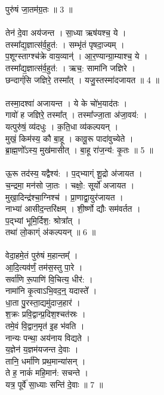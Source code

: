 पुरु॑षं जा॒तम॑ग्र॒तः ॥ 3 ॥\\
\\
तेन॑ दे॒वा अय॑जन्त । सा॒ध्या ऋष॑यश्च॒ ये ।\\
तस्मा᳚द्य॒ज्ञात्स॑र्व॒हुत॑: । सम्भृ॑तं पृषदा॒ज्यम् ।\\
प॒शूग्‍स्ताग्‍श्च॑क्रे वाय॒व्यान्॑ । आ॒र॒ण्यान्ग्रा॒म्याश्च॒ ये ।\\
तस्मा᳚द्य॒ज्ञात्स॑र्व॒हुत॑: । ऋच॒: सामा॑नि जज्ञिरे ।\\
छन्दाग्ं॑सि जज्ञिरे॒ तस्मा᳚त् । यजु॒स्तस्मा॑दजायत ॥ 4 ॥\\
\\
तस्मा॒दश्वा॑ अजायन्त । ये के चो॑भ॒याद॑तः ।\\
गावो॑ ह जज्ञिरे॒ तस्मा᳚त् । तस्मा᳚ज्जा॒ता अ॑जा॒वय॑: ।\\
यत्पुरु॑षं॒ व्य॑दधुः । क॒ति॒धा व्य॑कल्पयन् ।\\
मुखं॒ किम॑स्य॒ कौ बा॒हू । कावू॒रू पादा॑वुच्येते ।\\
ब्रा॒ह्म॒णो᳚ऽस्य॒ मुख॑मासीत् । बा॒हू रा॑ज॒न्य॑: कृ॒तः ॥ 5 ॥\\
\\
ऊ॒रू तद॑स्य॒ यद्वैश्य॑: । प॒द्भ्याग्ं शू॒द्रो अ॑जायत ।\\
च॒न्द्रमा॒ मन॑सो जा॒तः । चक्षो॒: सूर्यो॑ अजायत ।\\
मुखा॒दिन्द्र॑श्चा॒ग्निश्च॑ । प्रा॒णाद्वा॒युर॑जायत ।\\
नाभ्या॑ आसीद॒न्तरि॑क्षम् । शी॒र्ष्णो द्यौः सम॑वर्तत ।\\
प॒द्भ्यां भूमि॒र्दिश॒: श्रोत्रा᳚त् ।\\
तथा॑ लो॒काग्ं अ॑कल्पयन् ॥ 6 ॥\\
\\
वेदा॒हमे॒तं पुरु॑षं म॒हान्तम्᳚ ।\\
आ॒दि॒त्यव॑र्णं॒ तम॑स॒स्तु पा॒रे ।\\
सर्वा॑णि रू॒पाणि॑ वि॒चित्य॒ धीर॑: ।\\
नामा॑नि कृ॒त्वाऽभि॒वद॒न्॒ यदास्ते᳚ ।\\
धा॒ता पु॒रस्ता॒द्यमु॑दाज॒हार॑ ।\\
श॒क्रः प्रवि॒द्वान्प्र॒दिश॒श्चत॑स्रः ।\\
तमे॒वं वि॒द्वान॒मृत॑ इ॒ह भ॑वति ।\\
नान्यः पन्था॒ अय॑नाय विद्यते ।\\
य॒ज्ञेन॑ य॒ज्ञम॑यजन्त दे॒वाः ।\\
तानि॒ धर्मा॑णि प्रथ॒मान्या॑सन् ।\\
ते ह॒ नाकं॑ महि॒मान॑: सचन्ते ।\\
यत्र॒ पूर्वे॑ सा॒ध्याः सन्ति॑ दे॒वाः ॥ 7 ॥\\
